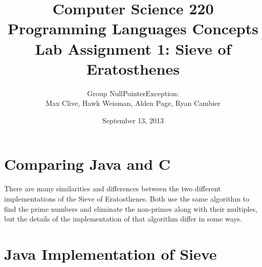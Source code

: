 \documentclass[a4paper,11pt]{article}
\title{Computer Science 220 \\[20pt]
Programming Languages Concepts\\ [20pt]
\textbf{Lab Assignment 1: Sieve of Eratosthenes}}
\author{Group NullPointerException: \\ Max Clive, Hawk Weisman, Alden Page, Ryan Cambier}
\date{September 13, 2013 }
\begin{document}
\maketitle

\section{Comparing Java and C}

There are many similarities and differences between the two different implementations of the Sieve of Eratosthenes. Both use the same algorithm to find the prime numbers and eliminate the non-primes along with their multiples, but the details of the implementation of that algorithm differ in some ways.

\section{Java Implementation of Sieve}
\end{document}
